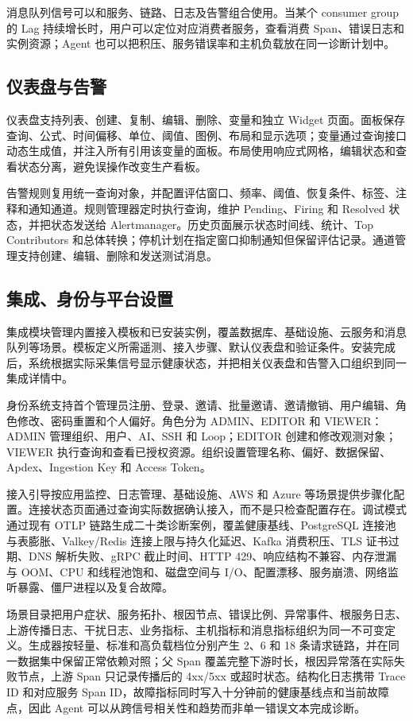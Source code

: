 \documentclass[conference,10pt]{IEEEtran}
\begin{document}
消息队列信号可以和服务、链路、日志及告警组合使用。当某个 consumer group 的 Lag 持续增长时，用户可以定位对应消费者服务，查看消费 Span、错误日志和实例资源；Agent 也可以把积压、服务错误率和主机负载放在同一诊断计划中。

\subsection{仪表盘与告警}

仪表盘支持列表、创建、复制、编辑、删除、变量和独立 Widget 页面。面板保存查询、公式、时间偏移、单位、阈值、图例、布局和显示选项；变量通过查询接口动态生成值，并注入所有引用该变量的面板。布局使用响应式网格，编辑状态和查看状态分离，避免误操作改变生产看板。

告警规则复用统一查询对象，并配置评估窗口、频率、阈值、恢复条件、标签、注释和通知通道。规则管理器定时执行查询，维护 Pending、Firing 和 Resolved 状态，并把状态发送给 Alertmanager。历史页面展示状态时间线、统计、Top Contributors 和总体转换；停机计划在指定窗口抑制通知但保留评估记录。通道管理支持创建、编辑、删除和发送测试消息。

\subsection{集成、身份与平台设置}

集成模块管理内置接入模板和已安装实例，覆盖数据库、基础设施、云服务和消息队列等场景。模板定义所需遥测、接入步骤、默认仪表盘和验证条件。安装完成后，系统根据实际采集信号显示健康状态，并把相关仪表盘和告警入口组织到同一集成详情中。

身份系统支持首个管理员注册、登录、邀请、批量邀请、邀请撤销、用户编辑、角色修改、密码重置和个人偏好。角色分为 ADMIN、EDITOR 和 VIEWER：ADMIN 管理组织、用户、AI、SSH 和 Loop；EDITOR 创建和修改观测对象；VIEWER 执行查询和查看已授权资源。组织设置管理名称、偏好、数据保留、Apdex、Ingestion Key 和 Access Token。

接入引导按应用监控、日志管理、基础设施、AWS 和 Azure 等场景提供步骤化配置。连接状态页面通过查询实际数据确认接入，而不是只检查配置存在。调试模式通过现有 OTLP 链路生成二十类诊断案例，覆盖健康基线、PostgreSQL 连接池与表膨胀、Valkey/Redis 连接上限与持久化延迟、Kafka 消费积压、TLS 证书过期、DNS 解析失败、gRPC 截止时间、HTTP 429、响应结构不兼容、内存泄漏与 OOM、CPU 和线程池饱和、磁盘空间与 I/O、配置漂移、服务崩溃、网络监听暴露、僵尸进程以及复合故障。

场景目录把用户症状、服务拓扑、根因节点、错误比例、异常事件、根服务日志、上游传播日志、干扰日志、业务指标、主机指标和消息指标组织为同一不可变定义。生成器按轻量、标准和高负载档位分别产生 2、6 和 18 条请求链路，并在同一数据集中保留正常依赖对照；父 Span 覆盖完整下游时长，根因异常落在实际失败节点，上游 Span 只记录传播后的 4xx/5xx 或超时状态。结构化日志携带 Trace ID 和对应服务 Span ID，故障指标同时写入十分钟前的健康基线点和当前故障点，因此 Agent 可以从跨信号相关性和趋势而非单一错误文本完成诊断。
\end{document}
